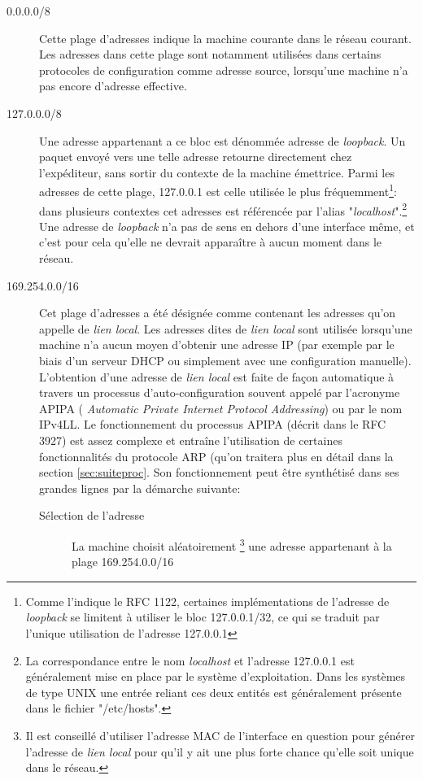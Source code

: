 \begin{description}
\item[0.0.0.0/8]
Cette plage d'adresses indique la machine courante dans le réseau courant.
Les adresses dans cette plage sont notamment utilisées dans certains protocoles de
configuration comme adresse source, lorsqu'une machine n'a pas encore d'adresse effective.

\item[127.0.0.0/8]
Une adresse appartenant a ce bloc est dénommée adresse de {\it loopback}.  Un
paquet envoyé vers une telle adresse retourne directement chez l'expéditeur, sans sortir
du contexte de la machine émettrice. Parmi les adresses de cette plage,
127.0.0.1 est celle utilisée le plus fréquemment\footnote{Comme l'indique
le RFC 1122, certaines implémentations de l'adresse de {\it loopback} se
limitent à utiliser le bloc 127.0.0.1/32, ce qui se traduit par l'unique utilisation de
l'adresse 127.0.0.1 }: dans plusieurs contextes cet adresses est référencée par
l'alias "{\it localhost}".\footnote{La correspondance entre le nom {\it localhost} et
l'adresse 127.0.0.1 est généralement mise en place par le système d'exploitation.
Dans les systèmes de type UNIX une entrée reliant ces deux entités est généralement
présente dans le fichier "/etc/hosts".}
Une adresse de {\it loopback} n'a pas de sens en dehors d'une interface même,
et c'est pour cela qu'elle ne devrait apparaître à aucun moment dans le réseau.

\item[169.254.0.0/16]
Cet plage d'adresses a été désignée comme contenant les adresses qu'on appelle
de {\it lien local}.  Les adresses dites de {\it lien local} sont utilisée lorsqu'une 
machine n'a aucun moyen d'obtenir une adresse IP (par exemple par le biais
d'un serveur DHCP ou simplement avec une configuration manuelle).  L'obtention
d'une adresse de {\it lien local} est faite de façon automatique à travers un
processus d'auto-configuration souvent appelé par l'acronyme APIPA ({\it
Automatic Private Internet Protocol Addressing}) ou par le nom IPv4LL.  Le
fonctionnement du processus APIPA (décrit dans le RFC 3927) est assez complexe
 et entraîne l'utilisation de certaines fonctionnalités du
protocole ARP (qu'on traitera plus en détail dans la section
\ref{sec:suiteproc}. Son fonctionnement peut être synthétisé dans ses grandes
lignes par la démarche suivante:

\begin{description}
\item[Sélection de l'adresse]
La machine choisit aléatoirement
    \footnote{Il est conseillé d'utiliser l'adresse MAC de l'interface en question
    pour générer l'adresse de {\it lien local} pour qu'il y ait une plus forte chance
    qu'elle soit unique dans le réseau.} 
une adresse appartenant à la plage 169.254.0.0/16


\end{description}
\end{description}
